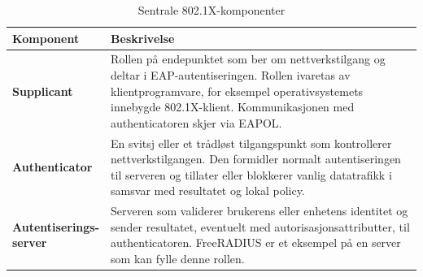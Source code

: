 \begin{table}[H]

\centering

\caption{Sentrale 802.1X-komponenter}

\label{tab:8021x-komponenter}

\small

\renewcommand{\arraystretch}{1.25}

\begin{tabular}{@{}ll@{}}

\toprule

\parbox[t]{0.2\textwidth}{\textbf{Komponent}} & \parbox[t]{0.6\textwidth}{\textbf{Beskrivelse}} \\

\midrule

\parbox[t]{0.2\textwidth}{\textbf{Supplicant}} & \parbox[t]{0.6\textwidth}{\raggedright Rollen på endepunktet som ber om nettverkstilgang og deltar i EAP-autentiseringen. Rollen ivaretas av klientprogramvare, for eksempel operativsystemets innebygde 802.1X-klient. Kommunikasjonen med authenticatoren skjer via EAPOL.} \\

\addlinespace

\parbox[t]{0.2\textwidth}{\textbf{Authenticator}} & \parbox[t]{0.6\textwidth}{\raggedright En svitsj eller et trådløst tilgangspunkt som kontrollerer nettverkstilgangen. Den formidler normalt autentiseringen til serveren og tillater eller blokkerer vanlig datatrafikk i samsvar med resultatet og lokal policy.} \\

\addlinespace

\parbox[t]{0.2\textwidth}{\textbf{Autentiserings-\newline server}} & \parbox[t]{0.6\textwidth}{\raggedright Serveren som validerer brukerens eller enhetens identitet og sender resultatet, eventuelt med autorisasjonsattributter, til authenticatoren. FreeRADIUS er et eksempel på en server som kan fylle denne rollen.} \\

\bottomrule

\end{tabular}

\end{table}


